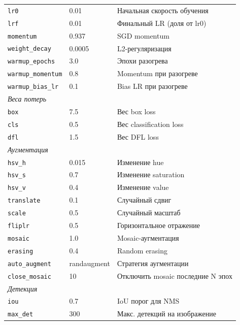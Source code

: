 \begin{longtable}{p{3.8cm} p{2.6cm} p{7cm}}
\texttt{lr0}              & 0.01       & Начальная скорость обучения \\
\texttt{lrf}              & 0.01       & Финальный LR (доля от lr0) \\
\texttt{momentum}         & 0.937      & SGD momentum \\
\texttt{weight\_decay}    & 0.0005     & L2-регуляризация \\
\texttt{warmup\_epochs}   & 3.0        & Эпохи разогрева \\
\texttt{warmup\_momentum} & 0.8        & Momentum при разогреве \\
\texttt{warmup\_bias\_lr} & 0.1        & Bias LR при разогреве \\
\midrule
\multicolumn{3}{l}{\textit{Веса потерь}} \\
\texttt{box}              & 7.5        & Вес box loss \\
\texttt{cls}              & 0.5        & Вес classification loss \\
\texttt{dfl}              & 1.5        & Вес DFL loss \\
\midrule
\multicolumn{3}{l}{\textit{Аугментация}} \\
\texttt{hsv\_h}           & 0.015      & Изменение hue \\
\texttt{hsv\_s}           & 0.7        & Изменение saturation \\
\texttt{hsv\_v}           & 0.4        & Изменение value \\
\texttt{translate}        & 0.1        & Случайный сдвиг \\
\texttt{scale}            & 0.5        & Случайный масштаб \\
\texttt{fliplr}           & 0.5        & Горизонтальное отражение \\
\texttt{mosaic}           & 1.0        & Mosaic-аугментация \\
\texttt{erasing}          & 0.4        & Random erasing \\
\texttt{auto\_augment}    & randaugment & Стратегия аугментации \\
\texttt{close\_mosaic}    & 10         & Отключить mosaic последние N эпох \\
\midrule
\multicolumn{3}{l}{\textit{Детекция}} \\
\texttt{iou}              & 0.7        & IoU порог для NMS \\
\texttt{max\_det}         & 300        & Макс. детекций на изображение \\
\end{longtable}

